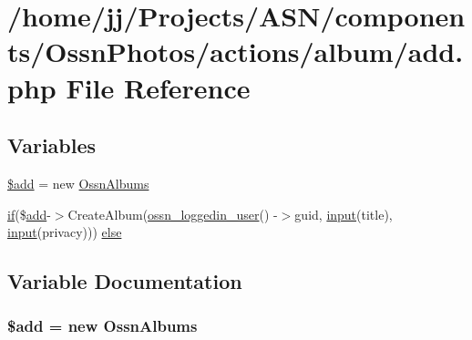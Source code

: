 \hypertarget{components_2_ossn_photos_2actions_2album_2add_8php}{}\section{/home/jj/\+Projects/\+A\+S\+N/components/\+Ossn\+Photos/actions/album/add.php File Reference}
\label{components_2_ossn_photos_2actions_2album_2add_8php}
\subsection*{Variables}
\begin{DoxyCompactItemize}
\item 
\hyperlink{components_2_ossn_photos_2actions_2album_2add_8php_a76aeb354fc71a358526ea9fbd7aae7a4}{\$add} = new \hyperlink{class_ossn_albums}{Ossn\+Albums}
\item 
\hyperlink{jquery_8tokeninput_8js_ad8dd46a3cbc004569e34401e9e71771a}{if}(\$\hyperlink{theme_8min_8js_a79ed6f45c867c160601f70dfa5ec2f95}{add}-\/$>$Create\+Album(\hyperlink{ossn_8lib_8users_8php_aa3c8068d0e6638b414d6a2f6c62565b8}{ossn\+\_\+loggedin\+\_\+user}() -\/$>$guid, \hyperlink{ossn_8lib_8input_8php_a64ebee98b041c4f75f71ed3cd73cc8ed}{input}(\textquotesingle{}title\textquotesingle{}), \hyperlink{ossn_8lib_8input_8php_a64ebee98b041c4f75f71ed3cd73cc8ed}{input}(\textquotesingle{}privacy\textquotesingle{}))) \hyperlink{components_2_ossn_photos_2actions_2album_2add_8php_af5960e8179dbe13c4d9fd37d66efc6b5}{else}
\end{DoxyCompactItemize}


\subsection{Variable Documentation}
\subsubsection[{\texorpdfstring{\$add}{$add}}]{\setlength{\rightskip}{0pt plus 5cm}\${\bf add} = new {\bf Ossn\+Albums}}\hypertarget{components_2_ossn_photos_2actions_2album_2add_8php_a76aeb354fc71a358526ea9fbd7aae7a4}{}\label{components_2_ossn_photos_2actions_2album_2add_8php_a76aeb354fc71a358526ea9fbd7aae7a4}


